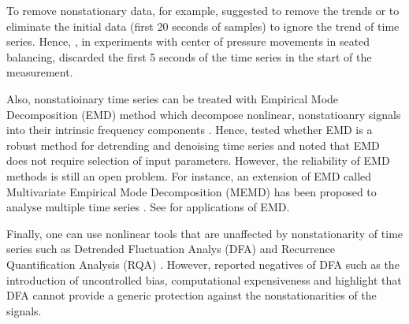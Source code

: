 To remove nonstationary data, for example, \cite{carroll1993} suggested 
to remove the trends or to eliminate the initial data (first 20 seconds 
of samples) to ignore the trend of time series. %
Hence, \cite{vandieen2010}, in experiments with center of pressure movements 
in seated balancing, discarded the first 5 seconds of the time series 
in the start of the measurement.

Also, nonstatioinary time series can be treated with Empirical Mode 
Decomposition (EMD) method which decompose nonlinear, nonstatioanry signals 
into their intrinsic frequency components \citep{huang1998, wu-huang2004, 
wu-huang2009}. Hence, \cite{flandrin2004, costa2007} tested whether EMD is a 
robust method for detrending and denoising time series and noted that 
 EMD does not require selection of input parameters. However, the reliability 
of EMD methods is still an open problem. For instance, an extension of EMD 
called Multivariate Empirical Mode Decomposition (MEMD) has been proposed 
to analyse multiple time series \citep{rehman2010, mandic2013}.
See \citep{wu-hu2006, costa2007, daubechies2011, bonnet2014, mert2018}
for applications of EMD.


Finally, one can use nonlinear tools that are unaffected by nonstationarity
of time series such as Detrended Fluctuation Analys (DFA) \citep{hausdorff1995}
and Recurrence Quantification Analysis (RQA) \citep{zbilut1992, trulla1996, 
marwan2008}. 
However, \cite{bryce2012} reported negatives of DFA such as the introduction
of uncontrolled bias, computational expensiveness and highlight 
that DFA cannot provide a generic protection against the nonstationarities 
of the signals.








